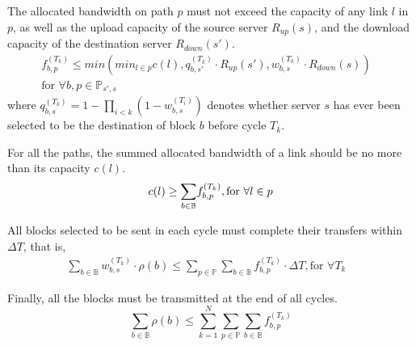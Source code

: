 \begin{packeditemize}
\item The allocated bandwidth on path $p$ must not exceed the
capacity of any link $l$ in $p$, as well as the upload capacity of
the source server $R_{up}(s)$, and the download capacity of the
destination server $R_{down}(s')$.
\begin{equation}
\begin{split}
f^{(T_k)}_{b,p} \leq min\left(min_{l\in p} c(l),
q_{b,s'}^{(T_k)}\cdot R_{up}(s'),
w_{b,s}^{(T_k)}\cdot R_{down}(s)\right) &\\
\text{for }\forall b, p\in \mathbb{P}_{s',s} &
\end{split}
\end{equation}
where $q_{b,s}^{(T_k)} = 1-\prod_{i<k} (1-w_{b,s}^{(T_i)})$ denotes
whether server $s$ has ever been selected to be the destination of
block $b$ before cycle $T_k$.

\item For all the paths, the summed allocated bandwidth of a link
should be no more than its capacity $c(l)$.
\begin{equation}
c(l) \geq \displaystyle{\sum_{b \in \mathbb{B}}}
f^{(T_k)}_{b,p},
\text{for }\forall l\in p\\
\end{equation}

\item All blocks selected to be sent in each cycle must complete
their transfers within $\Delta T$, that is,
\begin{equation}
\begin{split}
\displaystyle{\sum_{b \in \mathbb{B}}} w_{b,s}^{(T_k)} \cdot \rho(b)
\leq \displaystyle{\sum_{p\in \mathbb{P}}}
\displaystyle{\sum_{b \in \mathbb{B}}} f^{(T_k)}_{b,p} \cdot
\Delta T,
\text{for }\forall T_k &
\end{split}
\end{equation}


\item Finally, all the blocks must be transmitted at the end of all
cycles.
\begin{equation}
\displaystyle{\sum_{b\in \mathbb{B}}} \rho(b) \leq
\displaystyle{\sum_{k=1}^{N}}
\displaystyle{\sum_{p\in \mathbb{P}}}
\displaystyle{\sum_{b\in \mathbb{B}}}
f_{b,p}^{(T_k)}
\end{equation}
\end{packeditemize}



